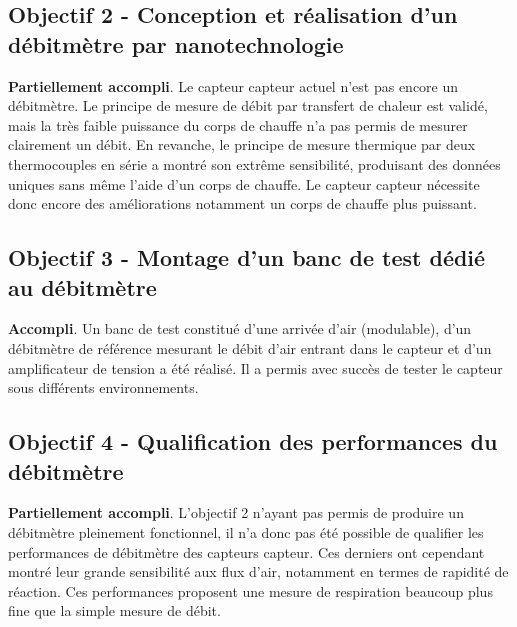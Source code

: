 \subsection*{Objectif 2 - Conception et réalisation d'un débitmètre par nanotechnologie}
\textbf{Partiellement accompli}. Le capteur \gls{capteur} actuel n'est pas encore un débitmètre. Le principe de mesure de débit par transfert 
de chaleur est validé, mais la très faible puissance du corps de chauffe n'a pas permis de mesurer clairement un débit. En revanche, le principe 
de mesure thermique par deux thermocouples en série a montré son extrême sensibilité, produisant des données uniques sans même l'aide d'un corps 
de chauffe. Le capteur \gls{capteur} nécessite donc encore des améliorations notamment un corps de chauffe plus puissant.


\subsection*{Objectif 3 - Montage d'un banc de test dédié au débitmètre}
\textbf{Accompli}. Un banc de test constitué d'une arrivée d'air (modulable), d'un débitmètre de référence mesurant le débit d'air entrant 
dans le capteur et d'un amplificateur de tension a été réalisé. Il a permis avec succès de tester le capteur sous différents environnements. 

\subsection*{Objectif 4 - Qualification des performances du débitmètre}
\textbf{Partiellement accompli}. L'objectif 2 n'ayant pas permis de produire un débitmètre pleinement fonctionnel, il n'a donc pas été possible 
de qualifier les performances de débitmètre des capteurs \gls{capteur}. Ces derniers ont cependant montré leur grande sensibilité aux flux d'air, notamment 
en termes de rapidité de réaction. Ces performances proposent une mesure de respiration beaucoup plus fine que la simple mesure de débit.  

